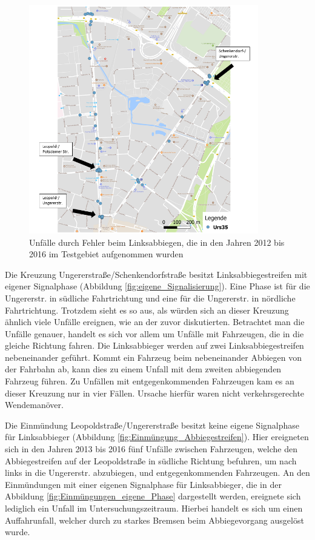 \begin{savenotes}
	\begin{figure}[H]
		\centering
		\includegraphics[width=10cm,height=10cm]{figures/map_Urs35}
		\caption[Unfälle durch Fehler beim Linksabbiegen, die in den Jahren 2012 bis 2016 im Testgebiet aufgenommen wurden]{Unfälle durch Fehler beim Linksabbiegen, die in den Jahren 2012 bis 2016 im Testgebiet aufgenommen wurden}\label{fig:map_Urs35}
	\end{figure}
\end{savenotes}

Die Kreuzung Ungererstraße/Schenkendorfstraße besitzt Linksabbiegestreifen mit eigener Signalphase (Abbildung  \ref{fig:eigene_Signalisierung}). Eine Phase ist für die Ungererstr. in südliche Fahrtrichtung und eine für die Ungererstr. in nördliche Fahrtrichtung. Trotzdem sieht es so aus, als würden sich an dieser Kreuzung ähnlich viele Unfälle ereignen, wie an der zuvor diskutierten. Betrachtet man die Unfälle genauer, handelt es sich vor allem um Unfälle mit Fahrzeugen, die in die gleiche Richtung fahren. Die Linksabbieger werden auf zwei Linksabbiegestreifen nebeneinander geführt. Kommt ein Fahrzeug beim nebeneinander Abbiegen von der Fahrbahn ab, kann dies zu einem Unfall mit dem zweiten abbiegenden Fahrzeug führen. Zu Unfällen mit entgegenkommenden Fahrzeugen kam es an dieser Kreuzung nur in vier Fällen. Ursache hierfür waren nicht verkehrsgerechte Wendemanöver.

Die Einmündung Leopoldstraße/Ungererstraße besitzt keine eigene Signalphase für Linksabbieger (Abbildung \ref{fig:Einmüngung_Abbiegestreifen}). Hier ereigneten sich in den Jahren 2013 bis 2016 fünf Unfälle zwischen Fahrzeugen, welche den Abbiegestreifen auf der Leopoldstraße in südliche Richtung befuhren, um nach links in die Ungererstr. abzubiegen, und entgegenkommenden Fahrzeugen. An den Einmündungen mit einer eigenen Signalphase für Linksabbieger, die in der Abbildung \ref{fig:Einmüngungen_eigene_Phase} dargestellt werden, ereignete sich lediglich ein Unfall im Untersuchungszeitraum. Hierbei handelt es sich um einen Auffahrunfall, welcher durch zu starkes Bremsen beim Abbiegevorgang ausgelöst wurde.

